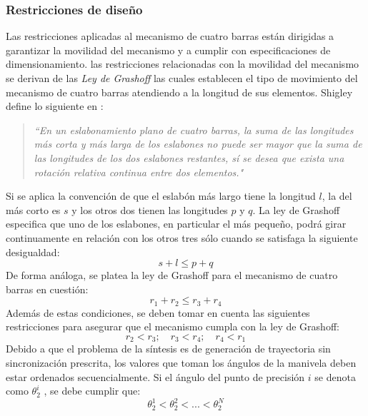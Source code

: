 \subsubsection{Restricciones de diseño}\label{sec:Restricciones de diseño MEC}
Las restricciones aplicadas al mecanismo de cuatro barras están dirigidas a garantizar la movilidad del mecanismo y a cumplir con especificaciones de dimensionamiento. las restricciones relacionadas con la movilidad del mecanismo se derivan de las \textit{Ley de Grashoff} las cuales establecen el tipo de movimiento del mecanismo de cuatro barras atendiendo a la longitud de sus elementos. Shigley define lo siguiente en \cite{shigley1983teoria}:
\begin{quote}
\textit{``{En un eslabonamiento plano de cuatro barras, la suma de las longitudes más corta y más larga de los eslabones no puede ser mayor que la suma de las longitudes de los dos eslabones restantes, sí se desea que exista una rotación relativa continua entre dos elementos}."} 
\end{quote}
Si se aplica la convención de que el eslabón más largo tiene la longitud $l$, la del más corto es $s$ y los otros dos tienen las longitudes $p$ y $q$. La ley de Grashoff especifica que uno de los eslabones, en particular el más pequeño, podrá girar continuamente en relación con los otros tres sólo cuando se satisfaga la siguiente desigualdad:
\begin{equation}
s+l \leq p+q
\end{equation}
De forma análoga, se platea la ley de Grashoff para el mecanismo de cuatro barras en cuestión:
\begin{equation}
r_1+r_2 \leq r_3+r_4
\end{equation}
Además de estas condiciones, se deben tomar en cuenta las siguientes restricciones  para asegurar que el mecanismo cumpla con la ley de Grashoff:
\begin{equation}
r_2 < r_3;\quad r_3 < r_4;\quad r_4 < r_1 
\end{equation}
Debido a que el problema de la síntesis es de generación de trayectoria sin sincronización prescrita, los valores que toman los ángulos de la manivela deben estar ordenados secuencialmente. Si el ángulo
del punto de precisión $i$ se denota como $\theta^i_2$ , se debe cumplir que:
\begin{equation}
\theta^1_2 < \theta^2_2< ... < \theta^N_2
\end{equation}
